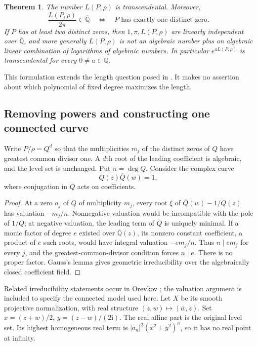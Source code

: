 \documentclass[11pt,a4paper]{article}
\numberwithin{equation}{section}
\newtheorem{theorem}{Theorem}[section]
\newtheorem{lemma}[theorem]{Lemma}
\theoremstyle{definition}
\theoremstyle{remark}
\newcommand{\Qb}{\overline{\mathbb Q}}
\newcommand{\ii}{\mathrm i}
\begin{document}
\begin{theorem}\label{thm:lem-length}
The number $L(P,\rho)$ is transcendental. Moreover,
\begin{equation}\label{eq:circle-dichotomy}
 \frac{L(P,\rho)}{2\pi}\in\Qb
 \quad\Longleftrightarrow\quad
 P\text{ has exactly one distinct zero}.
\end{equation}
If $P$ has at least two distinct zeros, then $1,\pi,L(P,\rho)$ are linearly
independent over $\Qb$, and more generally $L(P,\rho)$ is not an algebraic
number plus an algebraic linear combination of logarithms of algebraic
numbers. In particular $e^{aL(P,\rho)}$ is transcendental for every
$0\ne a\in\Qb$.
\end{theorem}
This formulation extends the length question posed in
\cite[Remark 8.16]{Tamiozzo}. It makes no assertion about which polynomial
of fixed degree maximizes the length.

\subsection{Removing powers and constructing one connected curve}
Write $P/\rho=Q^d$ so that the multiplicities $m_j$ of the distinct zeros
of $Q$ have greatest common divisor one. A $d$th root of the leading
coefficient is algebraic, and the level set is unchanged. Put $n=\deg Q$.
Consider the complex curve
\begin{equation}\label{eq:complex-lem}
 Q(z)\overline Q(w)=1,
\end{equation}
where conjugation in $\overline Q$ acts on coefficients.

\begin{proof}
At a zero $a_j$ of $Q$ of multiplicity $m_j$, every root $\xi$ of
$\overline Q(w)-1/Q(z)$ has valuation $-m_j/n$. Nonnegative valuation
would be incompatible with the pole of $1/Q$; at negative valuation, the
leading term of $\overline Q$ is uniquely minimal.
If a monic factor of degree $e$ existed over $\Qb(z)$, its nonzero constant
coefficient, a product of $e$ such roots, would have integral valuation
$-em_j/n$. Thus $n\mid em_j$ for every $j$, and the greatest-common-divisor
condition forces $n\mid e$. There is no proper factor. Gauss's lemma gives
geometric irreducibility over the algebraically closed coefficient field.
\end{proof}
Related irreducibility statements occur in Orevkov \cite{Orevkov}; the
valuation argument is included to specify the connected model used here.
Let $X$ be its smooth projective normalization, with real structure
$(z,w)\mapsto(\overline w,\overline z)$. Set
$x=(z+w)/2$, $y=(z-w)/(2\ii)$. The real affine part is the original level
set. Its highest homogeneous real term is
$|a_n|^2(x^2+y^2)^n$, so it has no real point at infinity.
\end{document}
